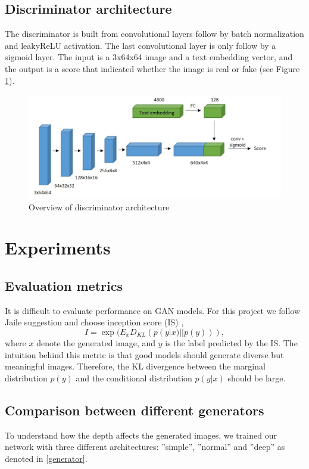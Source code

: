 \documentclass[a4paper]{article}
\begin{document}
\subsection{Discriminator architecture}
The discriminator is built from convolutional layers follow by batch normalization and leakyReLU activation. The last convolutional layer is only follow by a sigmoid layer. The input is a 3x64x64 image and a text embedding vector, and the output is a score that indicated whether the image is real or fake (see Figure \ref{fig:Disc}).

 \begin{figure}[ht]
    \centering
    \includegraphics[width=\textwidth]{disc.jpg}
    \caption{Overview of discriminator architecture}
    \label{fig:Disc}
\end{figure}


\section{Experiments}
\subsection{Evaluation metrics}
It is difficult to evaluate performance on GAN models. For this project we follow Jaile suggestion and choose inception score (IS) \cite{salimans2016improved},
\begin{equation}
    I = \exp({E_x D_{KL} (p(y|x)||p(y)))}, 
\end{equation}
where $x$ denote the generated image, and $y$ is the label predicted by the IS. The intuition behind this metric  is that good models should generate diverse but meaningful images. Therefore, the KL divergence between the marginal distribution $p(y)$ and the conditional distribution $p(y|x)$ should be large.

\subsection{Comparison between different generators}
To understand how the depth affects the generated images, we trained our network with three different architectures: ”simple”, ”normal” and ”deep” as denoted in \ref{generator}.
\end{document}
